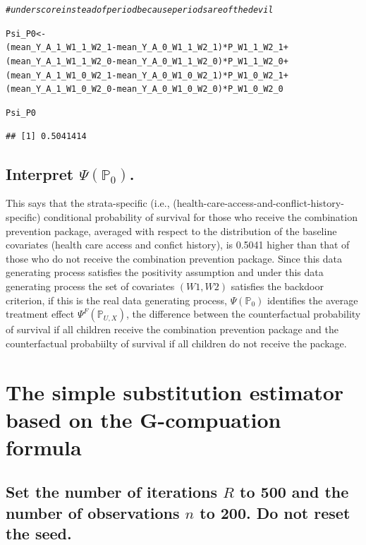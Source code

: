 \documentclass{article}\usepackage[]{graphicx}\usepackage[]{xcolor}
\makeatletter
\newcommand{\hlcom}[1]{\textcolor[rgb]{0.678,0.584,0.686}{\textit{#1}}}%
\newcommand{\hlopt}[1]{\textcolor[rgb]{0,0,0}{#1}}%
\newcommand{\hlstd}[1]{\textcolor[rgb]{0.345,0.345,0.345}{#1}}%
\newcommand{\hlkwb}[1]{\textcolor[rgb]{0.69,0.353,0.396}{#1}}%
\newenvironment{kframe}{%
 \def\at@end@of@kframe{}%
 \ifinner\ifhmode%
  \def\at@end@of@kframe{\end{minipage}}%
  \begin{minipage}{\columnwidth}%
 \fi\fi%
 \def\FrameCommand##1{\hskip\@totalleftmargin \hskip-\fboxsep
 \colorbox{shadecolor}{##1}\hskip-\fboxsep
     \hskip-\linewidth \hskip-\@totalleftmargin \hskip\columnwidth}%
 \MakeFramed {\advance\hsize-\width
   \@totalleftmargin\z@ \linewidth\hsize
   \@setminipage}}%
 {\par\unskip\endMakeFramed%
 \at@end@of@kframe}
\newenvironment{knitrout}{}{} %
\makeatother
\begin{document}
\begin{knitrout}
\begin{kframe}
\begin{alltt}
\hlcom{# underscore instead of period because periods are of the devil}

\hlstd{Psi_P0} \hlkwb{<-}
  \hlstd{(mean_Y_A_1_W1_1_W2_1} \hlopt{-} \hlstd{mean_Y_A_0_W1_1_W2_1)}\hlopt{*}\hlstd{P_W1_1_W2_1} \hlopt{+}
  \hlstd{(mean_Y_A_1_W1_1_W2_0} \hlopt{-} \hlstd{mean_Y_A_0_W1_1_W2_0)}\hlopt{*}\hlstd{P_W1_1_W2_0} \hlopt{+}
  \hlstd{(mean_Y_A_1_W1_0_W2_1} \hlopt{-} \hlstd{mean_Y_A_0_W1_0_W2_1)}\hlopt{*}\hlstd{P_W1_0_W2_1} \hlopt{+}
  \hlstd{(mean_Y_A_1_W1_0_W2_0} \hlopt{-} \hlstd{mean_Y_A_0_W1_0_W2_0)}\hlopt{*}\hlstd{P_W1_0_W2_0}

\hlstd{Psi_P0}
\end{alltt}
\begin{verbatim}
## [1] 0.5041414
\end{verbatim}
\end{kframe}
\end{knitrout}
  
  \subsection{Interpret $\Psi(\mathbb{P}_0)$.}
  
This says that the strata-specific (i.e., (health-care-access-and-conflict-history-specific) conditional probability of survival for those who receive the combination prevention package, averaged with respect to the distribution of the baseline covariates (health care access and confict history), is 0.5041 higher than that of those who do not receive the combination prevention package. Since this data generating process satisfies the positivity assumption and under this data generating process the set of covariates $(W1, W2)$ satisfies the backdoor criterion, if this is the real data generating process, $\Psi(\mathbb{P}_0)$ identifies the average treatment effect $\Psi^F(\mathbb{P}_{U,X})$, the difference between the counterfactual probability of survival if all children receive the combination prevention package and the counterfactual probabiilty of survival if all children do not receive the package.





\section{The simple substitution estimator based on the G-compuation formula}

  \subsection{Set the number of iterations $R$ to 500 and the number of observations $n$ to 200. Do not reset the seed.}
  
\end{document}
